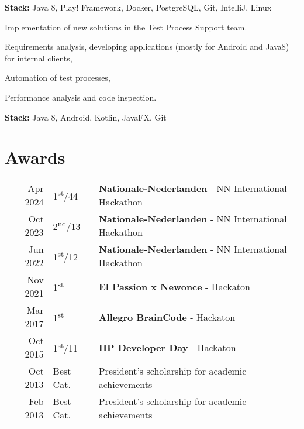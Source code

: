 \textbf{Stack:} Java 8, Play! Framework, Docker, PostgreSQL, Git, IntelliJ, Linux
\sectionsep

Implementation of new solutions in the Test Process Support team.
\begin{tightemize}
\item Requirements analysis, developing applications (mostly for Android and Java8) for internal clients, 
\item Automation of test processes,
\item Performance analysis and code inspection.
\end{tightemize}
\textbf{Stack:} Java 8, Android, Kotlin, JavaFX, Git
\sectionsep

\sectionsep


 \section{Awards} 
 \begin{tabular}{rll}
 Apr 2024	     & 1\textsuperscript{st}/44     & \textbf{Nationale-Nederlanden} - NN International Hackathon \\
 Oct 2023	     & 2\textsuperscript{nd}/13     & \textbf{Nationale-Nederlanden} - NN International Hackathon \\
 Jun 2022	     & 1\textsuperscript{st}/12     & \textbf{Nationale-Nederlanden} - NN International Hackathon \\
 Nov 2021	     & 1\textsuperscript{st}     & \textbf{El Passion x Newonce} - Hackaton \\
 Mar 2017	     & 1\textsuperscript{st}     & \textbf{Allegro BrainCode} - Hackaton \\
 Oct 2015	     & 1\textsuperscript{st}/11  & \textbf{HP Developer Day}  - Hackaton\\
 Oct 2013      & Best Cat.  & President’s scholarship for academic achievements \\
 Feb 2013      & Best Cat.  & President’s scholarship for academic achievements \\
 \end{tabular}
 \sectionsep